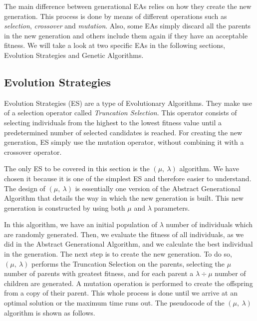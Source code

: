 The main difference between generational EAs relies on how they create the new generation. This process is done by means of different operations such as \textit{selection}, \textit{crossover} and \textit{mutation}. Also, some EAs simply discard all the parents in the new generation and others include them again if they have an acceptable fitness. We will take a look at two specific EAs in the following sections, Evolution Strategies and Genetic Algorithms.


\subsection{Evolution Strategies}

Evolution Strategies (ES) \cite{luke13metaheuristics} are a type of Evolutionary Algorithms. They make use of a selection operator called \textit{Truncation Selection}. This operator consists of selecting individuals from the highest to the lowest fitness value until a predetermined number of selected candidates is reached. For creating the new generation, ES simply use the mutation operator, without combining it with a crossover operator.

The only ES to be covered in this section is the $(\mu,\ \lambda)$ algorithm. We have chosen it because it is one of the simplest ES and therefore easier to understand. The design of $(\mu,\ \lambda)$ is essentially one version of the Abstract Generational Algorithm that details the way in which the new generation is built. This new generation is constructed by using both $\mu$ and $\lambda$ parameters.


In this algorithm, we have an initial population of $\lambda$ number of individuals which are randomly generated. Then, we evaluate the fitness of all individuals, as we did in the Abstract Generational Algorithm, and we calculate the best individual in the generation. The next step is to create the new generation. To do so, $(\mu,\ \lambda)$ performs the Truncation Selection on the parents, selecting the $\mu$ number of parents with greatest fitness, and for each parent a $\lambda \div \mu$ number of children are generated. A mutation operation is performed to create the offspring from a copy of their parent. This whole process is done until we arrive at an optimal solution or the maximum time runs out. The pseudocode of the $(\mu,\ \lambda)$ algorithm is shown as follows.

